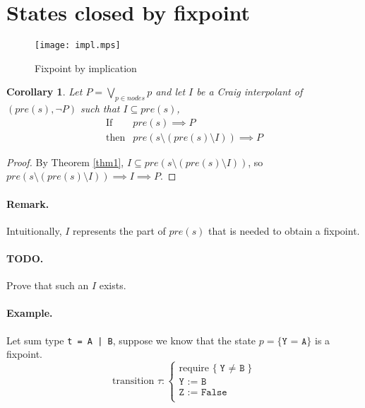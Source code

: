 \documentclass{article}
\newtheorem{cor}[thm]{Corollary}
\begin{document}
\clearpage

\section{States closed by fixpoint}

\begin{figure}[h]\centering
  \texttt{[image: impl.mps]}
  \caption{Fixpoint by implication}
\label{fig:impl}
\end{figure}


\begin{cor}
  Let $P = \bigvee_{p \in nodes}{p}$ and
  let $I$ be a Craig interpolant of $(pre(s), \neg P)$ such that $I
  \subseteq pre(s)$,
  \[
  \begin{array}{rl}
    \mbox{If}& pre(s) \implies P\\
    \mbox{then}& pre(s \setminus (pre(s) \setminus I)) \implies P
  \end{array}
  \]
\end{cor}


\begin{proof}

  By Theorem \ref{thm1}, $I \subseteq pre(s \setminus (pre(s) \setminus I))$,
  so $pre(s \setminus (pre(s) \setminus I)) \implies I \implies P$. 

\end{proof}

\paragraph{Remark.} 
Intuitionally, $I$ represents the part of $pre(s)$ that is needed to
obtain a fixpoint.

\paragraph{TODO.} 
Prove that such an $I$ exists.

\paragraph{Example.} 
Let sum type \texttt{t = A | B}, suppose we
know that the state $p = \texttt{\{Y = A\}}$ is a fixpoint.\\
\[
\mbox{transition }\tau : \left\{
\begin{array}{l}
  \mbox{require }\{ \texttt{Y $\neq$ B} \}\\
  \texttt{Y := B}\\
  \texttt{Z := False}\\
\end{array}\right.
\]
\end{document}
